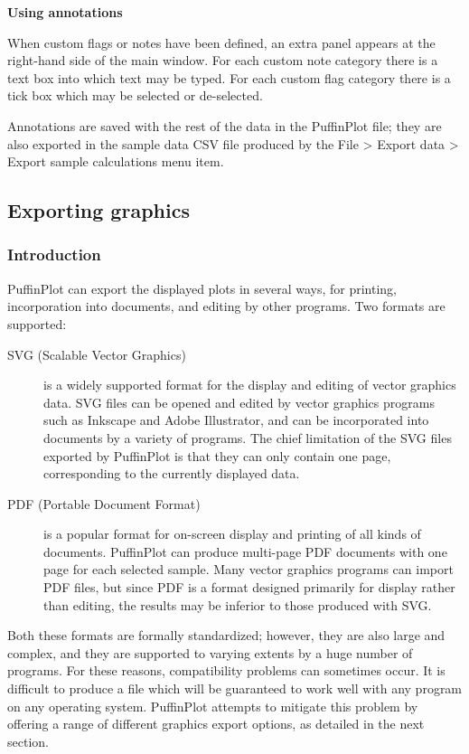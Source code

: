 \documentclass[a4paper,british]{article}
\newcommand{\ppcmd}[1]{\textsf{#1}} %
\newcommand{\caps}[1]{\MakeTextUppercase{#1}} %
\newcommand{\submenu}{ \textgreater{} } %
\newcommand{\mypara}[1]{\noindent\textbf{#1}

\noindent\ignorespaces} %
\begin{document}
\mypara{Using annotations}When custom flags or notes have been defined,
an extra panel appears at the right-hand side of the main window. For
each custom note category there is a text box into which text may be
typed. For each custom flag category there is a tick box which may be
selected or de-selected.

Annotations are saved with the rest of the data in the PuffinPlot file; they
are also exported in the sample data \caps{csv} file produced by the
\ppcmd{File\submenu Export data\submenu Export sample calculations} menu
item.

\subsection{\label{sec:graphics-export}Exporting graphics}

\subsubsection{Introduction}

PuffinPlot can export the displayed plots in several ways, for printing,
incorporation into documents, and editing by other programs. Two formats are
supported:

\begin{description}

\item[SVG (Scalable Vector Graphics)] is a widely supported format for the
  display and editing of vector graphics data. SVG files can be opened and
  edited by vector graphics programs such as Inkscape and Adobe Illustrator,
  and can be incorporated into documents by a variety of programs. The chief
  limitation of the SVG files exported by PuffinPlot is that they can
  only contain one page, corresponding to the currently displayed data.

\item[PDF (Portable Document Format)] is a popular format for on-screen
  display and printing of all kinds of documents. PuffinPlot can produce
  multi-page PDF documents with one page for each selected sample.
  Many vector graphics programs can import PDF files, but since PDF is 
  a format designed primarily for display rather than editing, the results
  may be inferior to those produced with SVG.

\end{description}

Both these formats are formally standardized; however, they are also large
and complex, and they are supported to varying extents by a huge number of
programs. For these reasons, compatibility problems can sometimes occur. It
is difficult to produce a file which will be guaranteed to work well with any
program on any operating system. PuffinPlot attempts to mitigate this problem
by offering a range of different graphics export options, as detailed in the
next section.
\end{document}
